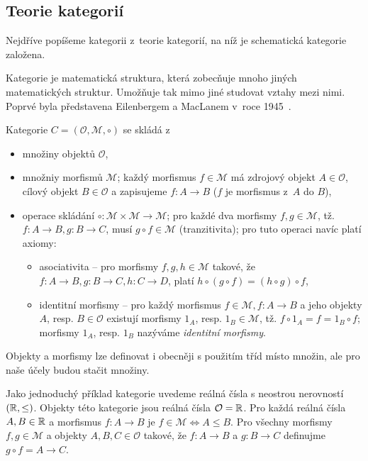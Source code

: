 \subsection{Teorie kategorií}

Nejdříve popíšeme kategorii z~teorie kategorií, na níž je schematická kategorie založena.

Kategorie je matematická struktura, která zobecňuje mnoho jiných matematických struktur.
Umožňuje tak mimo jiné studovat vztahy mezi nimi.
Poprvé byla představena Eilenbergem a MacLanem v~roce 1945~\cite{eilenberg_generaltheory_1945}.

Kategorie $C=(\mathcal O, \mathcal M, \circ)$ se skládá
z~\begin{itemize}
  \item množiny objektů $\mathcal O$,
  \item množniy morfismů $\mathcal M$; každý morfismus $f \in \mathcal M$ má zdrojový objekt $A\in\mathcal O$, cílový objekt $B\in\mathcal O$ a zapisujeme $f: A\to B$ ($f$ je morfismus z~$A$ do $B$),
  \item operace skládání $\circ\colon \mathcal M\times\mathcal M \to \mathcal M$; pro každé dva morfismy $f,g\in\mathcal M$, tž. $f\colon A\to B, g\colon B\to C$, musí $g\circ f\in \mathcal M$ (tranzitivita); pro tuto operaci navíc platí axiomy:
        \begin{itemize}
          \item asociativita -- pro morfismy $f,g,h\in\mathcal M$ takové, že $f\colon A\to B, g\colon B\to C, h\colon C\to D$, platí $h\circ (g \circ f) = (h\circ g)\circ f$,
          \item identitní morfismy -- pro každý morfismus $f\in\mathcal M, f\colon A\to B$ a jeho objekty $A$, resp. $B\in\mathcal O$ existují morfismy $1_A$, resp. $1_B\in\mathcal M$, tž. $f\circ 1_A = f = 1_B\circ f$; morfismy $1_A$, resp. $1_B$ nazýváme \emph{identitní morfismy}.
        \end{itemize}
\end{itemize}

Objekty a morfismy lze definovat i obecněji s použitím tříd místo množin, ale pro naše účely budou stačit množiny.

Jako jednoduchý příklad kategorie uvedeme reálná čísla s neostrou nerovností $(\mathbb{R}, \leq)$. Objekty této kategorie jsou reálná čísla $\mathcal O=\mathbb{R}$.
Pro každá reálná čísla $A,B\in\mathbb{R}$ a morfismus $f\colon A\to B$ je $f\in\mathcal M\iff A\leq B$.
Pro všechny morfismy $f,g\in\mathcal M$ a objekty $A, B, C\in\mathcal O$ takové, že $f\colon A\to B$ a $g\colon B\to C$ definujme $g\circ f=A\to C$.

